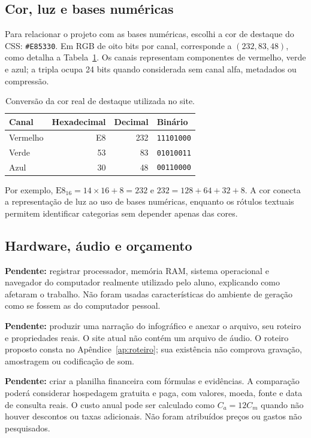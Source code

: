 \documentclass[12pt,a4paper]{article}
\newcommand{\pendente}[1]{\textbf{Pendente:} #1}
\begin{document}
\subsection{Cor, luz e bases numéricas}
Para relacionar o projeto com as bases numéricas, escolhi a cor de destaque do CSS: \texttt{\#E85330}. Em RGB de oito bits por canal, corresponde a $(232,83,48)$, como detalha a Tabela~\ref{tab:cor}. Os canais representam componentes de vermelho, verde e azul; a tripla ocupa 24 bits quando considerada sem canal alfa, metadados ou compressão.
\begin{table}[htbp]\centering
\begin{tabular}{lrrl}\toprule Canal & Hexadecimal & Decimal & Binário\\\midrule
Vermelho & E8 & 232 & \texttt{11101000}\\
Verde & 53 & 83 & \texttt{01010011}\\
Azul & 30 & 48 & \texttt{00110000}\\\bottomrule
\end{tabular}
\caption{Conversão da cor real de destaque utilizada no site.}\label{tab:cor}
\end{table}
Por exemplo, $\mathrm{E8}_{16}=14\times16+8=232$ e $232=128+64+32+8$. A cor conecta a representação de luz ao uso de bases numéricas, enquanto os rótulos textuais permitem identificar categorias sem depender apenas das cores.
\subsection{Hardware, áudio e orçamento}
\pendente{registrar processador, memória RAM, sistema operacional e navegador do computador realmente utilizado pelo aluno, explicando como afetaram o trabalho.} Não foram usadas características do ambiente de geração como se fossem as do computador pessoal.

\pendente{produzir uma narração do infográfico e anexar o arquivo, seu roteiro e propriedades reais.} O site atual não contém um arquivo de áudio. O roteiro proposto consta no Apêndice~\ref{ap:roteiro}; sua existência não comprova gravação, amostragem ou codificação de som.

\pendente{criar a planilha financeira com fórmulas e evidências.} A comparação poderá considerar hospedagem gratuita e paga, com valores, moeda, fonte e data de consulta reais. O custo anual pode ser calculado como $C_a=12C_m$ quando não houver descontos ou taxas adicionais. Não foram atribuídos preços ou gastos não pesquisados.
\end{document}

